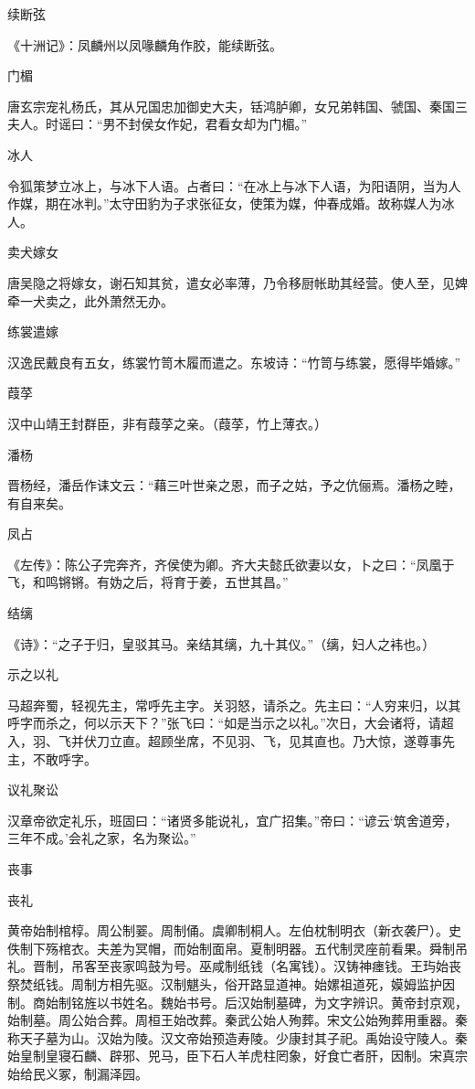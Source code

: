 \documentclass[a4paper,12pt,UTF8,twoside]{ctexbook}
\begin{document}
    续断弦
    
    《十洲记》：凤麟州以凤喙麟角作胶，能续断弦。
    
    门楣
    
    唐玄宗宠礼杨氏，其从兄国忠加御史大夫，铦鸿胪卿，女兄弟韩国、虢国、秦国三夫人。时谣曰：“男不封侯女作妃，君看女却为门楣。”
    
    冰人
    
    令狐策梦立冰上，与冰下人语。占者曰：“在冰上与冰下人语，为阳语阴，当为人作媒，期在冰判。”太守田豹为子求张征女，使策为媒，仲春成婚。故称媒人为冰人。
    
    卖犬嫁女
    
    唐吴隐之将嫁女，谢石知其贫，遣女必率薄，乃令移厨帐助其经营。使人至，见婢牵一犬卖之，此外萧然无办。
    
    练裳遣嫁
    
    汉逸民戴良有五女，练裳竹笥木履而遣之。东坡诗：“竹笥与练裳，愿得毕婚嫁。”
    
    葭莩
    
    汉中山靖王封群臣，非有葭莩之亲。（葭莩，竹上薄衣。）
    
    潘杨
    
    晋杨经，潘岳作诔文云：“藉三叶世亲之恩，而子之姑，予之伉俪焉。潘杨之睦，有自来矣。
    
    凤占
    
    《左传》：陈公子完奔齐，齐侯使为卿。齐大夫懿氏欲妻以女，卜之曰：“凤凰于飞，和鸣锵锵。有妫之后，将育于姜，五世其昌。”
    
    结缡
    
    《诗》：“之子于归，皇驳其马。亲结其缡，九十其仪。”（缡，妇人之袆也。）
    
    示之以礼
    
    马超奔蜀，轻视先主，常呼先主字。关羽怒，请杀之。先主曰：“人穷来归，以其呼字而杀之，何以示天下？”张飞曰：“如是当示之以礼。”次日，大会诸将，请超入，羽、飞并伏刀立直。超顾坐席，不见羽、飞，见其直也。乃大惊，遂尊事先主，不敢呼字。
    
    议礼聚讼
    
    汉章帝欲定礼乐，班固曰：“诸贤多能说礼，宜广招集。”帝曰：“谚云‘筑舍道旁，三年不成。’会礼之家，名为聚讼。”
    
    丧事
    
    丧礼
    
    黄帝始制棺椁。周公制翣。周制俑。虞卿制桐人。左伯枕制明衣（新衣袭尸）。史佚制下殇棺衣。夫差为冥帽，而始制面帛。夏制明器。五代制灵座前看果。舜制吊礼。晋制，吊客至丧家鸣鼓为号。巫咸制纸钱（名寓钱）。汉铸神瘗钱。王玙始丧祭焚纸钱。周制方相先驱。汉制魌头，俗开路显道神。始嫘祖道死，嫫姆监护因制。商始制铭旌以书姓名。魏始书号。后汉始制墓碑，为文字辨识。黄帝封京观，始制墓。周公始合葬。周桓王始改葬。秦武公始人殉葬。宋文公始殉葬用重器。秦称天子墓为山。汉始为陵。汉文帝始预造寿陵。少康封其子祀。禹始设守陵人。秦始皇制皇寝石麟、辟邪、兕马，臣下石人羊虎柱罔象，好食亡者肝，因制。宋真宗始给民义冢，制漏泽园。
    
\end{document}
